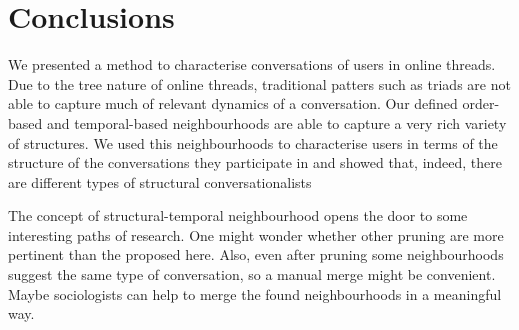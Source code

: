 \documentclass[conference]{IEEEtran}
\begin{document}



\section{Conclusions}
We presented a method to characterise conversations of users in online threads. Due to the tree nature of online threads, traditional patters such as triads are not able to capture much of relevant dynamics of a conversation. Our defined order-based and temporal-based neighbourhoods 
are able to capture a very rich variety of structures. We used this neighbourhoods to characterise users in terms of the structure of the conversations they participate in and showed that, indeed, there are different types of structural conversationalists

The concept of structural-temporal neighbourhood opens the door to some interesting paths of research. One might wonder whether other pruning are more pertinent than the proposed here. Also, even after pruning some neighbourhoods suggest the same type of conversation, so a manual merge might be convenient. Maybe sociologists can help to merge the found neighbourhoods in a meaningful way.   
 





%


\end{document}
